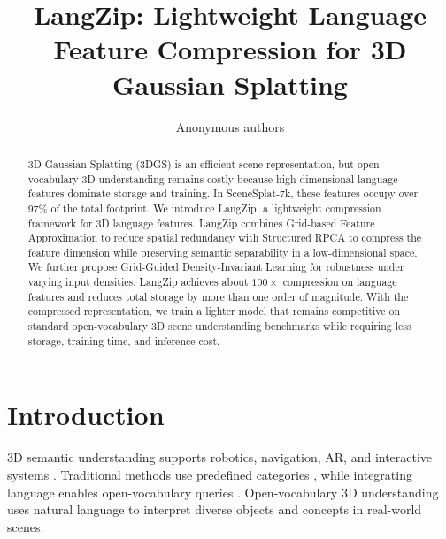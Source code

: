 \documentclass[10pt,twocolumn,letterpaper]{article}
\title{LangZip: Lightweight Language Feature Compression for 3D Gaussian Splatting}
\author{Anonymous authors}
\begin{document}
\maketitle
\begin{abstract}
  3D Gaussian Splatting (3DGS) is an efficient scene representation, but open-vocabulary 3D understanding remains costly because high-dimensional language features dominate storage and training. In SceneSplat-7k, these features occupy over 97\% of the total footprint. We introduce LangZip, a lightweight compression framework for 3D language features. LangZip combines Grid-based Feature Approximation to reduce spatial redundancy with Structured RPCA to compress the feature dimension while preserving semantic separability in a low-dimensional space. We further propose Grid-Guided Density-Invariant Learning for robustness under varying input densities. LangZip achieves about $100\times$ compression on language features and reduces total storage by more than one order of magnitude. With the compressed representation, we train a lighter model that remains competitive on standard open-vocabulary 3D scene understanding benchmarks while requiring less storage, training time, and inference cost.
\end{abstract}


\section{Introduction}
\label{sec:intro}
3D semantic understanding supports robotics, navigation, AR, and interactive systems \cite{rosinol20203d,tian2024drivevlm,zhou2020cylinder3d}. Traditional methods use predefined categories \cite{dai2017scannet,yeshwanth2023scannet++,gupta2015indoor}, while integrating language enables open-vocabulary queries \cite{jiang2024open}.
Open-vocabulary 3D understanding uses natural language to interpret diverse objects and concepts in real-world scenes.
\end{document}
